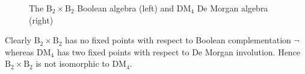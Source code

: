 \documentclass{amsart}
\theoremstyle{plain}
\theoremstyle{definition}
\begin{document}
\begin{figure}[ht]
    \centering
{}
\par
\vspace{.5cm}
    \caption{The $\text{B}_2\times \text{B}_2$ Boolean algebra (left) and $\text{DM}_4$ De Morgan algebra (right)}
    \label{hasse diagrams of de morgan algebras}
    \label{fig:DM4}
\end{figure}

Clearly $\text{B}_2\times \text{B}_2$ has no fixed points with respect to Boolean complementation $\neg$ whereas $\text{DM}_4$ has two fixed points with respect to De Morgan involution. Hence $\text{B}_2\times \text{B}_2$ is not isomorphic to $\text{DM}_4$.
\end{document}

